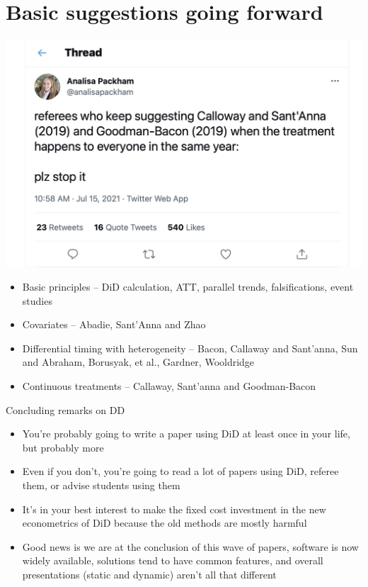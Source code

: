 \documentclass{beamer}
\begin{document}




\section{Basic suggestions going forward}

\begin{frame}

\begin{center}
\includegraphics[scale=0.15]{./lecture_includes/analisa.jpg}
\end{center}

\footnotesize
\begin{itemize}
\item Basic principles -- DiD calculation, ATT, parallel trends, falsifications, event studies
\item Covariates -- Abadie, Sant'Anna and Zhao
\item Differential timing with heterogeneity -- Bacon, Callaway and Sant'anna, Sun and Abraham, Borusyak, et al., Gardner, Wooldridge
\item Continuous treatments -- Callaway, Sant'anna and Goodman-Bacon
\end{itemize}

\end{frame}

\begin{frame}{Concluding remarks on DD}

\begin{itemize} 
\item You're probably going to write a paper using DiD at least once in your life, but probably more
\item Even if you don't, you're going to read a lot of papers using DiD, referee them, or advise students using them
\item It's in your best interest to make the fixed cost investment in the new econometrics of DiD because the old methods are mostly harmful
\item Good news is we are at the conclusion of this wave of papers, software is now widely available, solutions tend to have common features, and overall presentations (static and dynamic) aren't all that different
\end{itemize}

\end{frame}
\end{document}
